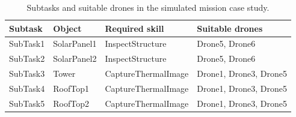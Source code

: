 \begin{table}[htbp]
\centering
\caption{Subtasks and suitable drones in the simulated mission case study.}
\label{tab:sim_subtasks_suitable_drones}
\begin{tabular}{llll}
\toprule
Subtask & Object & Required skill & Suitable drones \\
\midrule
SubTask1 & SolarPanel1 & InspectStructure & Drone5, Drone6 \\
SubTask2 & SolarPanel2 & InspectStructure & Drone5, Drone6 \\
SubTask3 & Tower & CaptureThermalImage & Drone1, Drone3, Drone5 \\
SubTask4 & RoofTop1 & CaptureThermalImage & Drone1, Drone3, Drone5 \\
SubTask5 & RoofTop2 & CaptureThermalImage & Drone1, Drone3, Drone5 \\
\bottomrule
\end{tabular}
\end{table}